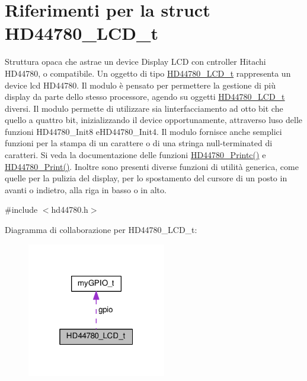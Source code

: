 \hypertarget{struct_h_d44780___l_c_d__t}{}\section{Riferimenti per la struct H\+D44780\+\_\+\+L\+C\+D\+\_\+t}
\label{struct_h_d44780___l_c_d__t}


Struttura opaca che astrae un device Display L\+CD con cntroller Hitachi H\+D44780, o compatibile. Un oggetto di tipo \hyperlink{struct_h_d44780___l_c_d__t}{H\+D44780\+\_\+\+L\+C\+D\+\_\+t} rappresenta un device lcd H\+D44780. Il modulo è pensato per permettere la gestione di più display da parte dello stesso processore, agendo su oggetti \hyperlink{struct_h_d44780___l_c_d__t}{H\+D44780\+\_\+\+L\+C\+D\+\_\+t} diversi. Il modulo permette di utilizzare sia l\textquotesingle{}interfacciamento ad otto bit che quello a quattro bit, inizializzando il device opportunamente, attraverso l\textquotesingle{}uso delle funzioni H\+D44780\+\_\+\+Init8 e\+H\+D44780\+\_\+\+Init4. Il modulo fornisce anche semplici funzioni per la stampa di un carattere o di una stringa null-\/terminated di caratteri. Si veda la documentazione delle funzioni \hyperlink{group___h_d44780_ga57b8c6ca0b3c12e5f7273b3c373a6f17}{H\+D44780\+\_\+\+Printc()} e \hyperlink{group___h_d44780_ga3aedff8e2040e62db569fde955d3987b}{H\+D44780\+\_\+\+Print()}. Inoltre sono presenti diverse funzioni di utilità generica, come quelle per la pulizia del display, per lo spostamento del cursore di un posto in avanti o indietro, alla riga in basso o in alto.  




{\ttfamily \#include $<$hd44780.\+h$>$}



Diagramma di collaborazione per H\+D44780\+\_\+\+L\+C\+D\+\_\+t\+:\nopagebreak
\begin{figure}[H]
\begin{center}
\leavevmode
\includegraphics[width=172pt]{struct_h_d44780___l_c_d__t__coll__graph}
\end{center}
\end{figure}
